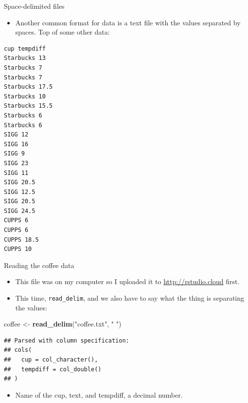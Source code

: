 \documentclass[
  ignorenonframetext,
]{beamer}
\newenvironment{Shaded}{\begin{snugshade}}{\end{snugshade}}
\newcommand{\KeywordTok}[1]{\textcolor[rgb]{0.13,0.29,0.53}{\textbf{#1}}}
\newcommand{\NormalTok}[1]{#1}
\newcommand{\StringTok}[1]{\textcolor[rgb]{0.31,0.60,0.02}{#1}}
\providecommand{\tightlist}{%
  \setlength{\itemsep}{0pt}\setlength{\parskip}{0pt}}
\begin{document}
\begin{frame}[fragile]{Space-delimited files}
\protect\hypertarget{space-delimited-files}{}

\begin{itemize}
\tightlist
\item
  Another common format for data is a text file with the values
  separated by spaces. Top of some other data:
\end{itemize}

\begin{verbatim}
cup tempdiff            
Starbucks 13            
Starbucks 7        
Starbucks 7        
Starbucks 17.5     
Starbucks 10       
Starbucks 15.5     
Starbucks 6        
Starbucks 6        
SIGG 12            
SIGG 16            
SIGG 9             
SIGG 23            
SIGG 11            
SIGG 20.5          
SIGG 12.5      
SIGG 20.5      
SIGG 24.5      
CUPPS 6    
CUPPS 6    
CUPPS 18.5 
CUPPS 10   
\end{verbatim}

\end{frame}

\begin{frame}[fragile]{Reading the coffee data}
\protect\hypertarget{reading-the-coffee-data}{}

\begin{itemize}
\tightlist
\item
  This file was on my computer so I uploaded it to
  \url{http://rstudio.cloud} first.
\item
  This time, \texttt{read\_delim}, and we also have to say what the
  thing is separating the values:
\end{itemize}

\begin{Shaded}
\begin{Highlighting}[]
\NormalTok{coffee <-}\StringTok{ }\KeywordTok{read_delim}\NormalTok{(}\StringTok{"coffee.txt"}\NormalTok{, }\StringTok{" "}\NormalTok{)}
\end{Highlighting}
\end{Shaded}

\begin{verbatim}
## Parsed with column specification:
## cols(
##   cup = col_character(),
##   tempdiff = col_double()
## )
\end{verbatim}

\begin{itemize}
\tightlist
\item
  Name of the cup, text, and tempdiff, a decimal number.
\end{itemize}

\end{frame}
\end{document}
